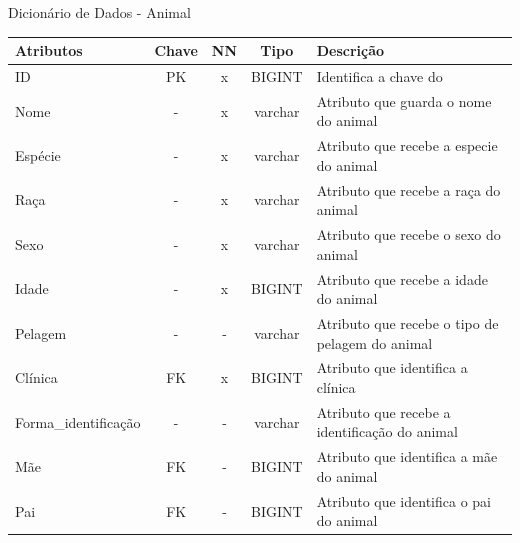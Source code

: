 \documentclass[
    12pt,               %
    openright,          %
    oneside,
    a4paper,            %
    BIBLATEX,           %
    TODO,               %
    english,            %
    brazil              %
    ]{ifsp-spo-inf-ctds}
\begin{document}
            \begin{center}
              \begin{quadro}[H]
              \centering
                  \caption{Dicionário de Dados - Animal}
                  \begin{tabulary}{1.0\textwidth}{|p{9em}|c|c|c|p{19em}|}
                \hline
                Atributos & Chave & NN & Tipo & Descrição\\
                \hline
                ID & PK & x & BIGINT & Identifica a chave do \\
                \hline
                Nome & - & x & varchar & Atributo que guarda o nome do animal\\
                \hline
                Espécie & - & x & varchar & Atributo que recebe a especie do animal\\
                \hline
                Raça & - & x & varchar & Atributo que recebe a raça do animal \\
                \hline
                Sexo & - & x & varchar & Atributo que recebe o sexo do animal\\
                \hline
                Idade & - & x & BIGINT & Atributo que recebe a idade do animal\\
                \hline
                Pelagem & - & - & varchar & Atributo que recebe o tipo de pelagem do animal \\
                \hline
                Clínica & FK & x & BIGINT & Atributo que identifica a clínica \\
                \hline
                Forma\_identificação & - & - & varchar & Atributo que recebe a identificação do animal\\
                \hline
                Mãe & FK & - & BIGINT & Atributo que identifica a mãe do animal \\
                \hline
                Pai & FK & - & BIGINT & Atributo que identifica o pai do animal \\
                \hline
                \end{tabulary}
                 
                  \label{qd: md-animal}
              \end{quadro}
            \end{center}
    
\end{document}
